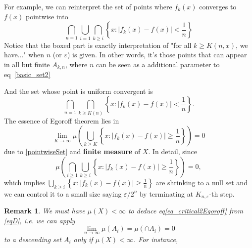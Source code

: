\documentclass{article}
\numberwithin{equation}{section}
\newtheorem{Remark}[Theorem]{Remark}
\begin{document}
For example, we can reinterpret the set of points where $f_{k}(x)$ converges to $f(x)$ pointwise into
\begin{equation}
    \label{pointwiseSet}
    \bigcap_{n=1} \boxed{\bigcup_{i=1} \bigcap_{k\geq i} \left\{x: |f_{k}(x)-f(x)|<\frac{1}{n}\right\}}
\end{equation}
Notice that the boxed part is exactly interpretation of "for all $k\geq K(n, x)$, we have..." when $n$ (or $\varepsilon$) is given. In other words, it's those points that can appear in all but finite $A_{k,n}$, where $n$ can be seen as a additional parameter to eq~\eqref{basic_set2} 

And the set whose point is uniform convergent is 
\begin{equation}
\label{uniformSet}
    \bigcap_{n=1} \boxed{\bigcap_{k\geq K(n)} \left\{x: |f_{k}(x)-f(x)|<\frac{1}{n}\right\}}.
\end{equation}
The essence of Egoroff theorem lies in 
\begin{equation}
\label{eq_critical2Egoroff}
    \lim_{K\to \infty} \mu\left(\bigcup_{k\geq K} \left\{x: |f_{k}(x)-f(x)|\geq \frac{1}{n}\right\}\right) = 0
\end{equation}
due to \eqref{pointwiseSet} and \textbf{finite measure} of $X$. In detail, since 
\begin{equation}
    \label{eqD}
    \mu\left(\bigcap _{i\geq 1} \bigcup_{k\geq i} \left\{x: |f_{k}(x)-f(x)|\geq \frac{1}{n}\right\}\right) = 0,
\end{equation}
which implies $\bigcup_{k\geq i} \left\{x: |f_{k}(x)-f(x)|\geq \frac{1}{n}\right\}$ are shrinking to a null set and we can control it to a small size saying $\varepsilon/2^n$ by terminating at $K_{n, \varepsilon}$-th step.

\begin{Remark}
    We must have $\mu(X)<\infty$ to deduce eq\eqref{eq_critical2Egoroff} from \eqref{eqD}, i.e. we can apply
    $$
    \lim_{n\to\infty} \mu(A_{i}) =\mu(\cap A_{i}) = 0
    $$
    to a descending set $A_{i}$ only if $\mu(X)<\infty$. For instance,
    
    \vspace{0.4cm}
    
    \vspace{0.4cm}
\end{Remark}
\end{document}
